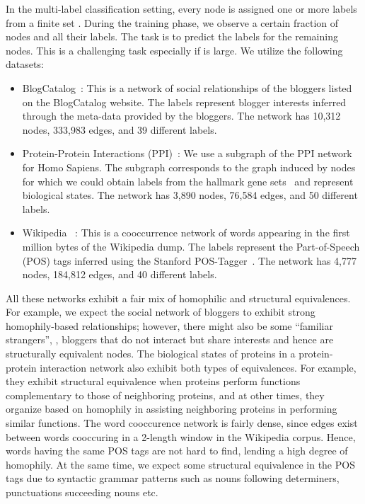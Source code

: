 In the multi-label classification setting, every node is assigned one or more labels from a finite set . During the training phase, we observe a certain fraction of nodes and all their labels. The task is to predict the labels for the remaining nodes. This is a challenging task especially if  is large. 
We utilize the following datasets:
\begin{itemize}[noitemsep,nolistsep]
	\item BlogCatalog~\cite{asu}: This is a network of social relationships of the bloggers listed on the BlogCatalog website. The labels represent blogger interests inferred through the meta-data provided by the bloggers. The network has 10,312 nodes, 333,983 edges, and 39 different labels.

	\item Protein-Protein Interactions (PPI)~\cite{biogrid}: We use a subgraph of the PPI network for Homo Sapiens. The subgraph corresponds to the graph induced by nodes for which we could obtain labels from the hallmark gene sets~\cite{msigdb} and represent biological states. 
	The network has 3,890 nodes, 76,584 edges, and 50 different labels.

	\item Wikipedia ~\cite{wiki-pos}: This is a cooccurrence network of words appearing in the first million bytes of the Wikipedia dump. The labels represent the Part-of-Speech (POS) tags inferred using the Stanford POS-Tagger~\cite{postagger}. The network has 4,777 nodes, 184,812 edges, and 40 different labels.
\end{itemize}

All these networks exhibit a fair mix of homophilic and structural equivalences. For example, we expect the social network of bloggers to exhibit strong homophily-based relationships; however, there might also be some ``familiar strangers'', \ie, bloggers that do not interact but share interests and hence are structurally equivalent nodes.
The biological states of proteins in a protein-protein interaction network also exhibit both types of equivalences. For example, they exhibit structural equivalence when proteins perform functions complementary to those of neighboring proteins, and at other times, they organize based on homophily in assisting neighboring proteins in performing similar functions. The word cooccurence network is fairly dense, since edges exist between words cooccuring in a 2-length window in the Wikipedia corpus. Hence, words having the same POS tags are not hard to find, lending a high degree of homophily. At the same time, we expect some structural equivalence in the POS tags due to syntactic grammar patterns such as nouns following determiners, punctuations succeeding nouns etc.

